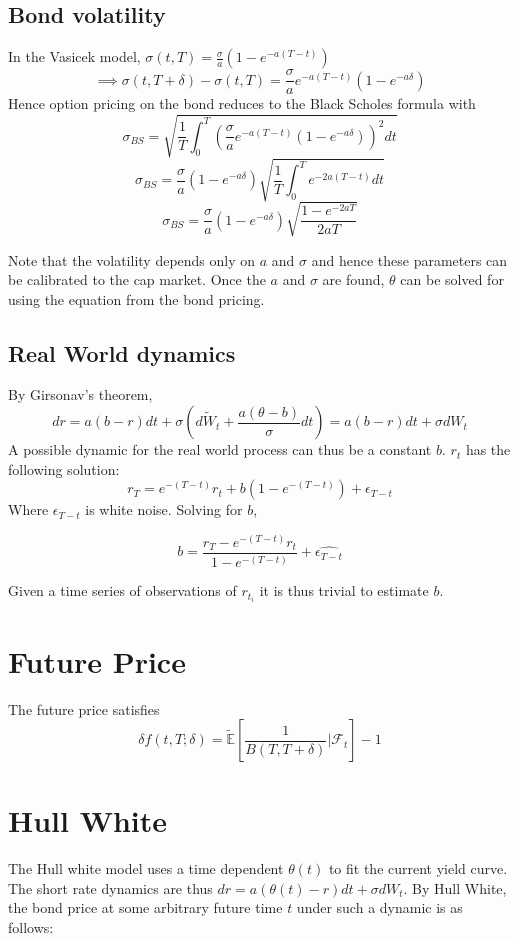 \documentclass{article}
\theoremstyle{definition}
\begin{document}
\subsection{Bond volatility}
In the Vasicek model, \(\sigma(t, T)=\frac{\sigma}{a}(1-e^{-a(T-t)})\)
\[\implies \sigma(t, T+\delta)-\sigma(t, T)=\frac{\sigma}{a}e^{-a(T-t)}\left(1-e^{-a\delta}\right)\]
Hence option pricing on the bond reduces to the Black Scholes formula with \[\sigma_{BS}=\sqrt{\frac{1}{T} \int_0 ^ T \left(\frac{\sigma}{a}e^{-a(T-t)}\left(1-e^{-a\delta}\right)\right)^2 dt}\]
\[\sigma_{BS}=\frac{\sigma}{a}\left(1-e^{-a\delta}\right)\sqrt{\frac{1}{T} \int_0 ^ T e^{-2a(T-t)} dt}\]
\[\sigma_{BS}=\frac{\sigma}{a}\left(1-e^{-a\delta}\right)\sqrt{\frac{1-e^{-2aT}}{2aT}}\]

Note that the volatility depends only on \(a\) and \(\sigma\) and hence these parameters can be calibrated to the cap market.  Once the \(a\) and \(\sigma\) are found, \(\theta\) can be solved for using the equation from the bond pricing.


\subsection{Real World dynamics}

By Girsonav's theorem, 
\[dr=a(b-r)dt+\sigma\left(d\tilde{W}_t+\frac{a(\theta-b)}{\sigma}dt\right)=a(b-r)dt+\sigma dW_t\]
A possible dynamic for the real world process can thus be a constant \(b\). \(r_t\) has the following solution:
\[r_T= e^{-(T-t)}r_t+b\left(1-e^{-(T-t)}\right)+\epsilon_{T-t}\]
Where \(\epsilon_{T-t}\) is white noise.  Solving for \(b\),

\[b=\frac{r_T-e^{-(T-t)}r_t}{1-e^{-(T-t)}}+\hat{\epsilon_{T-t}}\]

Given a time series of observations of \(r_{t_i}\) it is thus trivial to estimate \(b\).

\section{Future Price}

The future price satisfies \[\delta f(t, T; \delta)=\tilde{\mathbb{E}}\left[\frac{1}{B(T, T+\delta)}|\mathcal{F}_t\right]-1\]

\section{Hull White}

The Hull white model uses a time dependent \(\theta(t)\) to fit the current yield curve.  The short rate dynamics are thus \(dr=a\left(\theta(t)-r\right)dt+\sigma dW_t\).  By Hull White, the bond price at some arbitrary future time \(t\) under such a dynamic is as follows:
\end{document}
